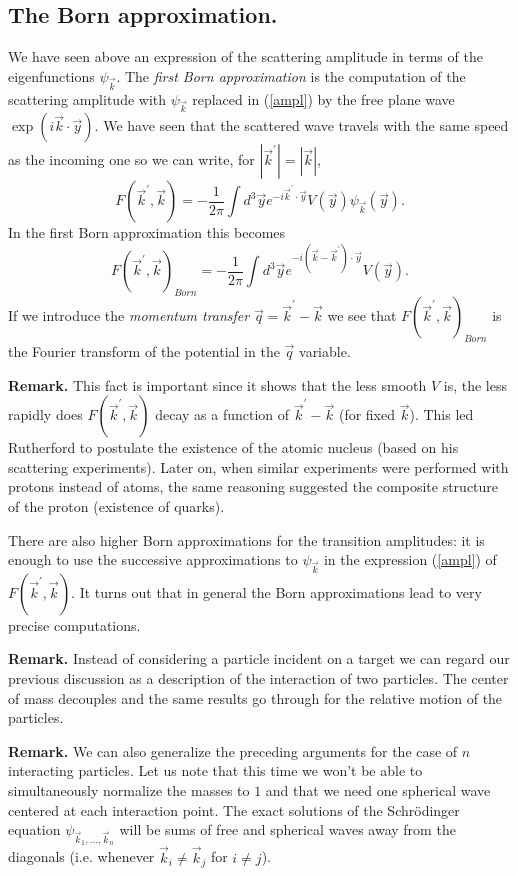 \documentclass[11pt]{article}
\def\p{\pi}
\newcommand{\vk}{{\vec{k}}}
\newcommand{\vy}{{\vec{y}}}
\newcommand{\vq}{{\vec{q}}}
\newcommand{\equ}[1]{\begin{equation}{#1}\end{equation}}
\begin{document}
\subsection{The Born approximation.}
We have seen above an expression of the scattering amplitude in terms of
the eigenfunctions $\psi_\vk$. The {\em first Born approximation} is the 
computation of the scattering amplitude with $\psi_\vk$ replaced in (\ref{ampl}) by
the free plane
wave $\exp (i\vk\cdot\vy )$. We have seen that the scattered wave travels with
the same speed as the incoming one so we can write, for $|\vk^\prime |= |\vk|$,
\equ{ F(\vk^\prime ,\vk ) =
-\frac{1}{2\p} \int d^3 \vy e^{-i \vk^\prime\cdot\vy} V(\vy )
\psi_\vk (\vy ) . }
In the first Born approximation this becomes 
\equ{ F(\vk^\prime ,\vk )_{Born} =
-\frac{1}{2\p} \int d^3 \vy e^{-i (\vk -\vk^\prime )\cdot \vy} V(\vy ) .}
If we introduce the {\em momentum transfer} $\vq = \vk^\prime -\vk $ we see
that $F(\vk^\prime ,\vk )_{Born}$ is the Fourier transform of the potential
in the $\vq$ variable.

{\bf Remark.} This fact is important since it shows that the less smooth
$V$ is, the less rapidly does $F(\vk^\prime ,\vk )$ decay as a function
of $\vk^\prime -\vk $ (for fixed $\vk$). This led Rutherford to postulate
the existence of the atomic nucleus (based on his scattering experiments). 
Later on, when similar experiments were performed with
protons instead of atoms, the same reasoning suggested the composite structure
of the proton (existence of quarks).

 There are also higher Born approximations
for the transition amplitudes: it is enough to use the successive 
approximations to $\psi_\vk$ in the expression (\ref{ampl}) of $F(\vk^\prime ,\vk )$.
It turns out that in general the Born approximations lead to very precise
computations.

{\bf Remark.} Instead of considering a particle incident on a target we can
regard our previous discussion as a description of the interaction
of two particles.
The center of mass decouples and the same results go through for the relative
motion of the particles.

{\bf Remark.} We can also generalize the preceding arguments for the case 
of $n$ interacting particles. Let us note that this time we won't be able to
simultaneously normalize the masses to $1$ and that we need one spherical
wave centered at each interaction point. The exact solutions of the
Schr\"odinger equation $\psi_{\vk_1 ,\ldots, \vk_n }$
will be sums of free and spherical waves away from the diagonals (i.e.
whenever $\vk_i \neq \vk_j$ for $i\neq j$).
\end{document}
